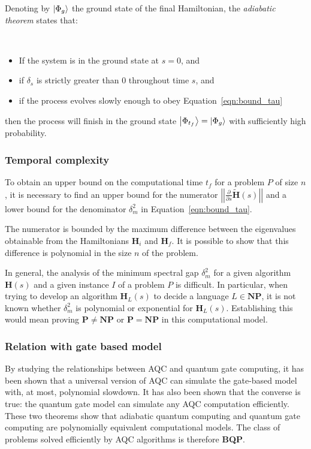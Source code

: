 Denoting by $\Ket{\Phi_g}$ the ground state of the final Hamiltonian, the \emph{adiabatic theorem} states that:
\begin{theorem}\ 
	\begin{itemize}
		\item If the system is in the ground state at $s = 0$, and
		\item if $\delta_s$ is strictly greater than $0$ throughout time $s$, and
		\item if the process evolves slowly enough to obey Equation~\ref{eqn:bound_tau}
	\end{itemize}
	then the process will finish in the ground state $\Ket{\Phi_{t_f}} = \Ket{\Phi_g}$ with sufficiently high probability.
\end{theorem}

\subsubsection*{Temporal complexity}
To obtain an upper bound on the computational time $t_f$ for a problem $P$ of size $n$, it is necessary to find an upper bound for the numerator $\left|\left|\frac{\partial}{\partial s} \tilde{\mathbf{H}}(s)\right|\right|$ and a lower bound for the denominator $\delta_m^2$ in Equation~\ref{eqn:bound_tau}.

The numerator is bounded by the maximum difference between the eigenvalues obtainable from the Hamiltonians $\mathbf{H}_i$ and $\mathbf{H}_f$. It is possible to show that this difference is polynomial in the size $n$ of the problem.

In general, the analysis of the minimum spectral gap $\delta_m^2$ for a given algorithm $\mathbf{H}(s)$ and a given instance $I$ of a problem $P$ is difficult. In particular, when trying to develop an algorithm $\mathbf{H}_{L}(s)$ to decide a language $L \in \textbf{NP}$, it is not known whether $\delta_m^2$ is polynomial or exponential for $\mathbf{H}_{L}(s)$. Establishing this would mean proving $\mathbf{P} \neq \textbf{NP}$ or $\mathbf{P} = \textbf{NP}$ in this computational model.
\newpage
\subsubsection*{Relation with gate based model}
By  studying the relationships between AQC and quantum gate computing, it has been shown that a universal version of AQC can simulate the gate-based model with, at most, polynomial slowdown. It has also been shown that the converse is true: the quantum gate model can simulate any AQC computation efficiently. These two theorems show that adiabatic quantum computing and quantum gate computing are polynomially equivalent computational models. The class of problems solved efficiently by AQC algorithms is therefore \textbf{BQP}.

